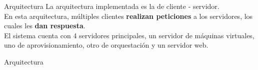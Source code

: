 \begin{frame}{Arquitectura}
    \vspace{0cm}
    La arquitectura implementada es la de cliente - servidor. 
    \vspace{0.5cm}
    \\
    En esta arquitectura, múltiples clientes \textbf{realizan peticiones} a los servidores, los cuales les \textbf{dan respuesta}.
    \vspace{0.5cm}
    \\
    El sistema cuenta con 4 servidores principales, un servidor de máquinas virtuales, uno de aprovisionamiento, otro de orquestación y un servidor web. 

\end{frame}

\begin{frame}{Arquitectura}
    \vspace{0.5cm}
    \begin{figure}[ht]
       \centering
       \vspace{-0.50cm}
    \end{figure}

\end{frame}

